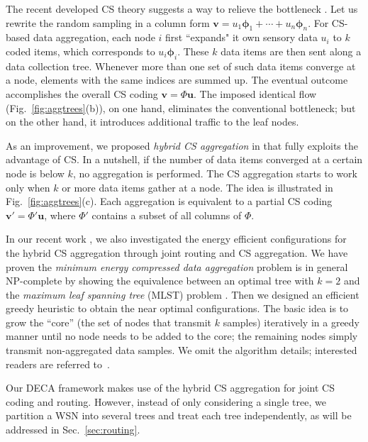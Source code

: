 \documentclass[conference]{IEEEtran}
\begin{document}
    The recent developed CS theory suggests a way to relieve the bottleneck \cite{Haupt-SPMag08, LuoWSC-MobiCom09}. Let us rewrite the random sampling in a column form $\mathbf{v} = u_1 \boldsymbol{\phi}_1 + \cdots + u_n \boldsymbol{\phi}_n$. For CS-based data aggregation, each node $i$ first ``expands" it own sensory data $u_i$ to $k$ coded items, which corresponds to $u_i\boldsymbol{\phi}_i$. These $k$ data items are then sent along a data collection tree. Whenever more than one set of such data items converge at a node, elements with the same indices are summed up. The eventual outcome accomplishes the overall CS coding $\mathbf{v} = \Phi\mathbf{u}$. The imposed identical flow (Fig.~\ref{fig:aggtrees}(b)), on one hand, eliminates the conventional bottleneck; but on the other hand, it introduces additional traffic to the leaf nodes.

    As an improvement, we proposed \textit{hybrid CS aggregation} in \cite{LuoXR-ICC10} that fully exploits the advantage of CS. In a nutshell, if the number of data items converged at a certain node is below $k$, no aggregation is performed. The CS aggregation starts to work only when $k$ or more data items gather at a node. The idea is illustrated in Fig.~\ref{fig:aggtrees}(c). Each aggregation is equivalent to a partial CS coding $\mathbf{v}' = \Phi'\mathbf{u}$, where $\Phi'$ contains a subset of all columns of $\Phi$.

    In our recent work \cite{XiangLV-SECON11}, we also investigated the energy efficient configurations for the hybrid CS aggregation through joint routing and CS aggregation. We have proven the \textit{minimum energy compressed data aggregation} problem is in general NP-complete by showing the equivalence between an optimal tree with $k=2$ and the \textit{maximum leaf spanning tree} (MLST) problem \cite{GareyJ79}. Then we designed an efficient greedy heuristic to obtain the near optimal configurations. The basic idea is to grow the ``core'' (the set of nodes that transmit $k$ samples) iteratively in a greedy manner until no node needs to be added to the core; the remaining nodes simply transmit non-aggregated data samples. We omit the algorithm details; interested readers are referred to~\cite{XiangLV-SECON11}.

    Our DECA framework makes use of the hybrid CS aggregation for joint CS coding and routing. However, instead of only considering a single tree, we partition a WSN into several trees and treat each tree independently, as will be addressed in Sec.~\ref{sec:routing}.
\end{document}
